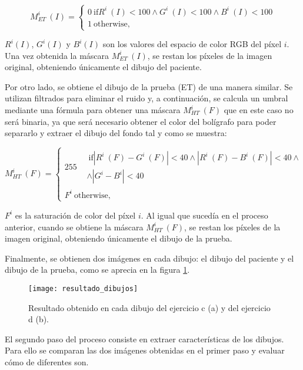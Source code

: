 \begin{equation}
	M^{i}_{ET}\ (I) = \left\lbrace\begin{array}{ll}
0~\text{if}R^{i}~(I)<100\wedge G^{i}~(I)<100\wedge B^{i}~(I)<100 \\ 1~\text{otherwise,} \end{array}\right.
\end{equation}

\(R^{i}(I)\), \(G^{i}(I)\) y \(B^{i}(I)\) son los valores del espacio de color RGB del píxel \(i\). Una vez obtenida la máscara \(M^{i}_{ET}\ (I)\), se restan los píxeles de la imagen original, obteniendo únicamente el dibujo del paciente.

Por otro lado, se obtiene el dibujo de la prueba (ET) de una manera similar. Se utilizan filtrados para eliminar el ruido y, a continuación, se calcula un umbral mediante una fórmula para obtener una máscara \(M^{i}_{HT}\ (F)\) que en este caso no será binaria, ya que será necesario obtener el color del bolígrafo para poder separarlo y extraer el dibujo del fondo tal y como se muestra:
 
\begin{equation}
	M^{i}_{HT}\ (F) = \left\lbrace\begin{array}{ll}
		255\begin{split}&~\text{if}|R^{i}~(F)-G^{i}~(F)|<40\wedge |R^{i}~(F)-B^{i}~(F)|<40\wedge \\ & \wedge|G^{i}-B^{i}|<40 \end{split} \\ F^i~\text{otherwise,} \end{array}\right.
\end{equation}

\(F^{i}\) es la saturación de color del píxel \(i\). Al igual que sucedía en el proceso anterior, cuando se  obtiene la máscara \(M^{i}_{HT}\ (F)\), se restan los píxeles de la imagen original, obteniendo únicamente el dibujo de la prueba.

Finalmente, se obtienen dos imágenes en cada dibujo: el dibujo del paciente y el dibujo de la prueba, como se aprecia en la figura \ref{fig:resultado}.

\begin{figure}[ht]
	\texttt{[image: resultado\_dibujos]}
	\caption{Resultado obtenido en cada dibujo del ejercicio c (a) y del ejercicio d (b).\cite{pereira2016new}}
	\label{fig:resultado}
\end{figure}

El segundo paso del proceso consiste en extraer características de los dibujos. Para ello se comparan las dos imágenes obtenidas en el primer paso y evaluar cómo de diferentes son. 

